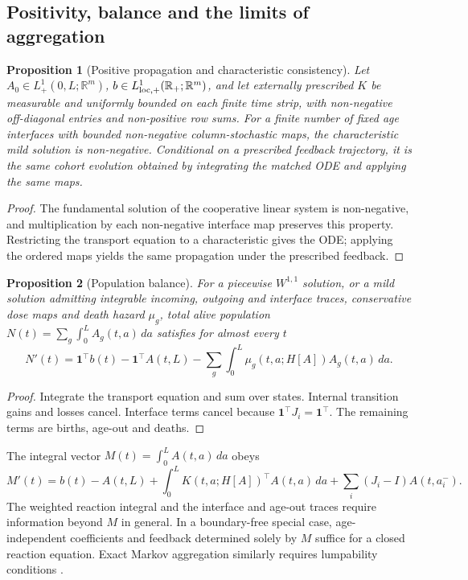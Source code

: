 \documentclass[10pt,letterpaper]{article}
\newtheorem{proposition}{Proposition}
\begin{document}
\subsection{Positivity, balance and the limits of aggregation}
\begin{proposition}[Positive propagation and characteristic consistency]
\raggedright
Let $A_0\in L^1_+(0,L;\mathbb R^m)$, $b\in L^1_{\rm loc,+}(\mathbb R_+;\mathbb R^m)$, and let externally prescribed $K$ be measurable and uniformly bounded on each finite time strip, with non-negative off-diagonal entries and non-positive row sums. For a finite number of fixed age interfaces with bounded non-negative column-stochastic maps, the characteristic mild solution is non-negative. Conditional on a prescribed feedback trajectory, it is the same cohort evolution obtained by integrating the matched ODE and applying the same maps.
\end{proposition}
\begin{proof}
The fundamental solution of the cooperative linear system is non-negative, and multiplication by each non-negative interface map preserves this property. Restricting the transport equation to a characteristic gives the ODE; applying the ordered maps yields the same propagation under the prescribed feedback.
\end{proof}

\begin{proposition}[Population balance]
For a piecewise $W^{1,1}$ solution, or a mild solution admitting integrable incoming, outgoing and interface traces, conservative dose maps and death hazard $\mu_g$, total alive population $N(t)=\sum_g\int_0^L A_g(t,a)\,da$ satisfies for almost every $t$
\begin{equation}
 N'(t)=\mathbf1^\top b(t)-\mathbf1^\top A(t,L)
       -\sum_g\int_0^L\mu_g(t,a;H[A])A_g(t,a)\,da.
 \label{eq:balance}
\end{equation}
\end{proposition}
\begin{proof}
Integrate the transport equation and sum over states. Internal transition gains and losses cancel. Interface terms cancel because $\mathbf1^\top J_i=\mathbf1^\top$. The remaining terms are births, age-out and deaths.
\end{proof}

The integral vector $M(t)=\int_0^L A(t,a)\,da$ obeys
\begin{equation}
 M'(t)=b(t)-A(t,L)+\int_0^L K(t,a;H[A])^\top A(t,a)\,da
       +\sum_i(J_i-I)A(t,a_i^-).
 \label{eq:aggregate}
\end{equation}
The weighted reaction integral and the interface and age-out traces require information beyond $M$ in general. In a boundary-free special case, age-independent coefficients and feedback determined solely by $M$ suffice for a closed reaction equation. Exact Markov aggregation similarly requires lumpability conditions \cite{Tian2006}.
\end{document}
